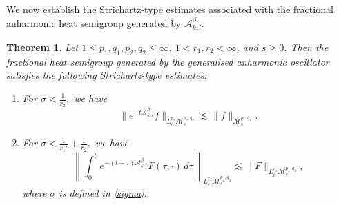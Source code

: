 \documentclass[12pt,reqno,a4paper]{amsart}
\numberwithin{equation}{section}
\theoremstyle{plain}
\newtheorem{theorem}{Theorem}[section]
\theoremstyle{definition}
\theoremstyle{remark}
\def\M{\mathcal{M}}
\def \Ad{\mathcal{A}_{k,l}}
\def \M{{\mathcal M}}
\begin{document}
We now establish the Strichartz-type estimates associated with the fractional anharmonic heat semigroup generated by \(\Ad^{\beta}\).
\begin{theorem}
\label{Strichartz}
Let \(1\leq p_{1},q_{1},p_{2},q_{2}\leq \infty\), \(1<r_{1},r_{2}<\infty\), and \(s\geq0\). Then the fractional heat semigroup generated by the generalised anharmonic oscillator satisfies the following Strichartz-type estimates:
\begin{enumerate}
\item[(i)] For
$\sigma<\frac{1}{r_{2}},$
we have
\begin{equation}
\label{1st strichartzconclusion}
\|e^{-t\Ad^{\beta}}f\|_{L^{r_{2}}_{t}\M^{p_{2},q_{2}}_{s}}
\lesssim
\|f\|_{\M^{p_{1},q_{1}}_{s}}.
\end{equation}
\item[(ii)] For
$\sigma<\frac{1}{r_{1}'}+\frac{1}{r_{2}},$
we have
\begin{equation}
\label{2nd strkzconclsn}
\left\|
\int_{0}^{t}
e^{-(t-\tau)\Ad^{\beta}}
F(\tau,\cdot)\,
d\tau
\right\|_{L^{r_{2}}_{t}\M^{p_{2},q_{2}}_{s}}
\lesssim
\|F\|_{L^{r_{1}}_{t}\M^{p_{1},q_{1}}_{s}},
\end{equation}
where \(\sigma\) is defined in \eqref{sigma}.
\end{enumerate}
\end{theorem}
\end{document}
